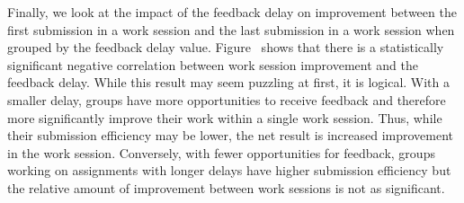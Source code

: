 Finally, we look at the impact of the feedback delay on improvement between the
first submission in a work session and the last submission in a work session
when grouped by the feedback delay
value. Figure~ shows that there is a
statistically significant negative correlation between work session improvement
and the feedback delay. While this result may seem puzzling at first, it is
logical. With a smaller delay, groups have more opportunities to receive
feedback and therefore more significantly improve their work within a single
work session. Thus, while their submission efficiency may be lower, the net
result is increased improvement in the work session. Conversely, with fewer
opportunities for feedback, groups working on assignments with longer delays
have higher submission efficiency but the relative amount of improvement
between work sessions is not as significant.
